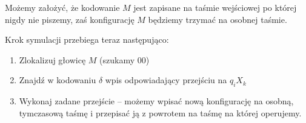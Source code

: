 Możemy założyć, że kodowanie \( M \) jest zapisane na taśmie wejściowej po której nigdy nie piszemy, zaś konfigurację \( M \) będziemy trzymać na osobnej taśmie.

Krok symulacji przebiega teraz następująco:
\begin{enumerate}
	\item Zlokalizuj głowicę \( M \) (szukamy \( 00 \))
	\item Znajdź w kodowaniu \( \delta \) wpis odpowiadający przejściu na \( q_i X_k \)
	\item Wykonaj zadane przejście -- możemy wpisać nową konfigurację na osobną, tymczasową taśmę i przepisać ją z powrotem na taśmę na której operujemy.

\end{enumerate}


